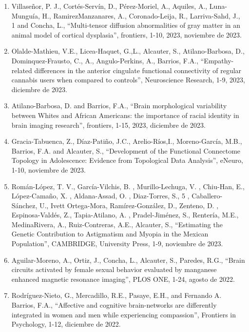 \begin{enumerate}
\item Villaseñor, P. J., Cortés-Servín, D., Pérez-Moriel, A., Aquiles, A., Luna-Munguía, H., RamirezManzanares, A., 
Coronado-Leija, R., Larriva-Sahd, J., 1 and Concha, L., “Multi-tensor diffusion abnormalities of gray matter in an animal 
model of cortical dysplasia”, frontiers, 1-10, 2023,    noviembre de 2023.

\item Olalde-Mathieu, V.E., Licea-Haquet, G.,L., Alcauter, S., Atilano-Barbosa, D., Dominquez-Frausto, C., A., 
Angulo-Perkins, 
A., Barrios, F.A., “Empathy-related differences in the anterior cingulate functional connectivity of regular cannabis users 
when compared to controls”, Neuroscience Research, 1-9, 2023,    diciembre de 2023.

\item Atilano-Barbosa, D. and Barrios, F.A., “Brain morphological variability between Whites and African Americans: the 
importance of racial identity in brain imaging research”, frontiers, 1-15, 2023,    
diciembre de 2023.

\item Gracia-Tabuenca, Z., Díaz-Patiño, J.C., Arelio-Ríos,I., Moreno-García, M.B., Barrios, F.A. and Alcauter, S., 
“Development 
of the Functional Connectome Topology in Adolescence: Evidence from Topological Data Analysis”, eNeuro, 1-10, noviembre de 2023.

\item Román-López, T. V., García-Vilchis, B. , Murillo-Lechuga, V. , Chiu-Han, E., López-Camaño, X. , Aldana-Assad, O. , 
Diaz-Torres, S., 5 , Caballero-Sánchez, U., Ivett Ortega-Mora, Ramírez-González, D., Zenteno, D. , Espinosa-Valdés, Z., 
Tapia-Atilano, A. , Pradel-Jiménez, S., Rentería, M.E., MedinaRivera, A., Ruiz-Contreras, A.E., Alcauter, S., “Estimating the 
Genetic Contribution to Astigmatism and Myopia in the Mexican Population”, CAMBRIDGE, University Press, 1-9, noviembre de 2023.

\item Aguilar-Moreno, A., Ortiz, J., Concha, L., Alcauter, S., Paredes, R.G., “Brain circuits activated by female sexual 
behavior evaluated by manganese enhanced magnetic resonance imaging”, PLOS ONE, 1-24,    
agosto de 2022.

\item Rodríguez-Nieto, G., Mercadillo, R.E., Pasaye, E.H., and Fernando A. Barrios, F.A., “Affective and cognitive 
brain-networks are differently integrated in women and men while experiencing compassion”, Frontiers in Psychology, 1-12, 
   diciembre de 2022.


\end{enumerate}
